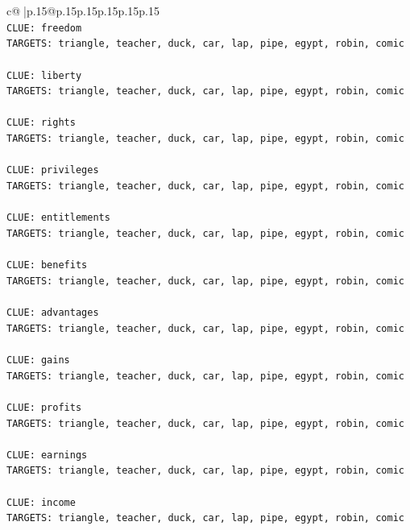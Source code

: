 \documentclass{article}
\begin{document}
{\begin{supertabular}{c@{$\;$}|p{.15\linewidth}@{}p{.15\linewidth}p{.15\linewidth}p{.15\linewidth}p{.15\linewidth}p{.15\linewidth}}
{{{\\ 
\texttt{CLUE: freedom} \\
\texttt{TARGETS: triangle, teacher, duck, car, lap, pipe, egypt, robin, comic} \\
\\ 
\texttt{CLUE: liberty} \\
\texttt{TARGETS: triangle, teacher, duck, car, lap, pipe, egypt, robin, comic} \\
\\ 
\texttt{CLUE: rights} \\
\texttt{TARGETS: triangle, teacher, duck, car, lap, pipe, egypt, robin, comic} \\
\\ 
\texttt{CLUE: privileges} \\
\texttt{TARGETS: triangle, teacher, duck, car, lap, pipe, egypt, robin, comic} \\
\\ 
\texttt{CLUE: entitlements} \\
\texttt{TARGETS: triangle, teacher, duck, car, lap, pipe, egypt, robin, comic} \\
\\ 
\texttt{CLUE: benefits} \\
\texttt{TARGETS: triangle, teacher, duck, car, lap, pipe, egypt, robin, comic} \\
\\ 
\texttt{CLUE: advantages} \\
\texttt{TARGETS: triangle, teacher, duck, car, lap, pipe, egypt, robin, comic} \\
\\ 
\texttt{CLUE: gains} \\
\texttt{TARGETS: triangle, teacher, duck, car, lap, pipe, egypt, robin, comic} \\
\\ 
\texttt{CLUE: profits} \\
\texttt{TARGETS: triangle, teacher, duck, car, lap, pipe, egypt, robin, comic} \\
\\ 
\texttt{CLUE: earnings} \\
\texttt{TARGETS: triangle, teacher, duck, car, lap, pipe, egypt, robin, comic} \\
\\ 
\texttt{CLUE: income} \\
\texttt{TARGETS: triangle, teacher, duck, car, lap, pipe, egypt, robin, comic} \\
\\ 
}}}
\end{supertabular}}
\end{document}
